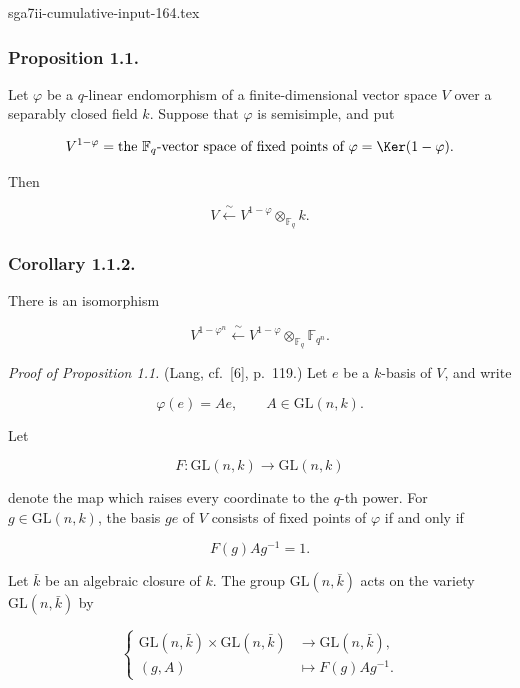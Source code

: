 \begin{filecontents*}{sga7ii-cumulative-input-164.tex}
\subsubsection*{Proposition 1.1.}
Let $\varphi$ be a $q$-linear endomorphism of a finite-dimensional vector
space $V$ over a separably closed field $k$. Suppose that $\varphi$ is
semisimple, and put

\[
V^{1-\varphi}
=\text{the $\mathbb F_q$-vector space of fixed points of $\varphi$}
=\Ker(1-\varphi).
\]

Then

\begin{equation}\tag{1.1.1}
V\xleftarrow{\ \sim\ }
V^{1-\varphi}\otimes_{\mathbb F_q}k.
\end{equation}

\subsubsection*{Corollary 1.1.2.}
There is an isomorphism

\[
V^{1-\varphi^n}\xleftarrow{\ \sim\ }
V^{1-\varphi}\otimes_{\mathbb F_q}\mathbb F_{q^n}.
\]

\medskip
\noindent\emph{Proof of Proposition 1.1.}
(Lang, cf.~[6], p.~119.)
Let $e$ be a $k$-basis of $V$, and write

\begin{equation}\tag{1.1.3}
\varphi(e)=Ae,\qquad A\in\mathrm{GL}(n,k).
\end{equation}

Let

\begin{equation}\tag{1.1.4}
F:\mathrm{GL}(n,k)\longrightarrow\mathrm{GL}(n,k)
\end{equation}

denote the map which raises every coordinate to the $q$-th power. For
$g\in\mathrm{GL}(n,k)$, the basis $ge$ of $V$ consists of fixed points of
$\varphi$ if and only if

\begin{equation}\tag{1.1.5}
F(g)Ag^{-1}=1.
\end{equation}

Let $\bar k$ be an algebraic closure of $k$. The group
$\mathrm{GL}(n,\bar k)$ acts on the variety $\mathrm{GL}(n,\bar k)$ by

\begin{equation}\tag{1.1.6}
\left\{
\begin{aligned}
\mathrm{GL}(n,\bar k)\times\mathrm{GL}(n,\bar k)
&\longrightarrow\mathrm{GL}(n,\bar k),\\
(g,A)&\longmapsto F(g)Ag^{-1}.
\end{aligned}
\right.
\end{equation}


\end{filecontents*}
